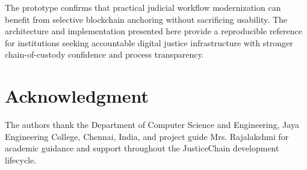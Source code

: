 \documentclass[conference]{IEEEtran}
\begin{document}
The prototype confirms that practical judicial workflow modernization can benefit from selective blockchain anchoring without sacrificing usability. The architecture and implementation presented here provide a reproducible reference for institutions seeking accountable digital justice infrastructure with stronger chain-of-custody confidence and process transparency.

\section*{Acknowledgment}
The authors thank the Department of Computer Science and Engineering, Jaya Engineering College, Chennai, India, and project guide Mrs. Rajalakshmi for academic guidance and support throughout the JusticeChain development lifecycle.
\end{document}
